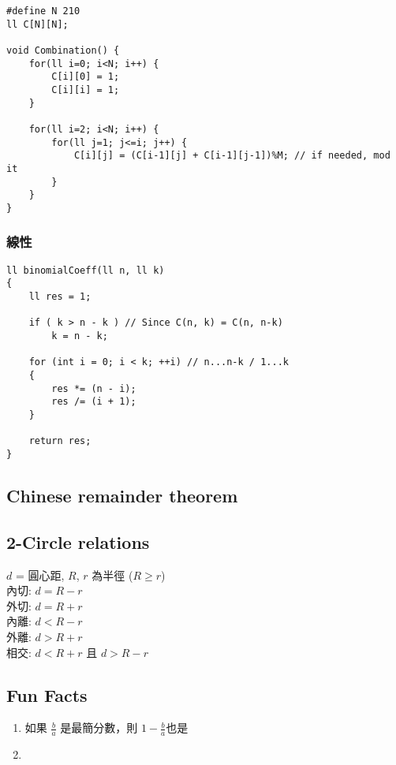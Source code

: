 \documentclass[10pt,oneside]{article}
\begin{document}
\begin{landscape}
\begin{multicols}{2}
\begin{lstlisting}
#define N 210
ll C[N][N];

void Combination() {
    for(ll i=0; i<N; i++) {
        C[i][0] = 1;
        C[i][i] = 1;
    }

    for(ll i=2; i<N; i++) {
        for(ll j=1; j<=i; j++) {
            C[i][j] = (C[i-1][j] + C[i-1][j-1])%M; // if needed, mod it
        }
    }
}
\end{lstlisting}

\subsubsection{線性}

\begin{lstlisting}
ll binomialCoeff(ll n, ll k)
{
    ll res = 1;
 
    if ( k > n - k ) // Since C(n, k) = C(n, n-k)
        k = n - k;
 
    for (int i = 0; i < k; ++i) // n...n-k / 1...k
    {
        res *= (n - i);
        res /= (i + 1);
    }
 
    return res;
}
\end{lstlisting}

\subsection{Chinese remainder theorem}

\subsection{2-Circle relations}

$d$ = 圓心距, $R$, $r$ 為半徑 ($R \geq r$)\\
內切: $d = R - r$\\
外切: $d = R + r$\\
內離: $d < R - r$\\
外離: $d > R + r$\\
相交: $d < R + r$ 且 $d > R - r$

\subsection{Fun Facts}

\begin{enumerate}
	\item 如果 $\frac b a$ 是最簡分數，則 $1 - \frac b a$也是%
	\item 
\end{enumerate}


\end{multicols}
\end{landscape}
\end{document}

